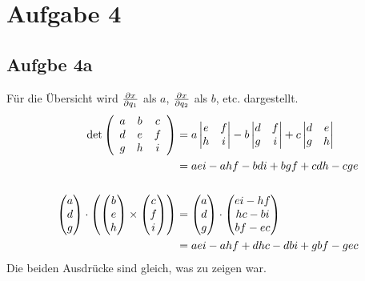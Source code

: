 \documentclass[a4paper,10pt]{extarticle}
\begin{document}
\section*{Aufgabe 4}
  \subsection*{Aufgbe 4a}
  Für die Übersicht wird $\pdv{x}{q_1}$ als $a$, $\pdv{x}{q_2}$ als $b$, etc. dargestellt.
  \begin{align*}
  \det \left(\begin{array}{c c c}
    a & b & c \\
    d & e & f \\
    g & h & i \\
  \end{array}\right) &= a \begin{vmatrix} e & f \\ h & i \end{vmatrix} - b \begin{vmatrix} d & f \\ g & i \end{vmatrix} + c \begin{vmatrix} d & e \\ g & h\end{vmatrix} \\
  &= aei - ahf - bdi + bgf + cdh - cge \\ \\
  \begin{pmatrix} a \\ d \\ g \end{pmatrix} \cdot \begin{pmatrix} \begin{pmatrix} b \\ e \\ h \end{pmatrix} \times \begin{pmatrix} c \\ f \\ i \end{pmatrix} \end{pmatrix} &= \begin{pmatrix} a \\ d \\ g \end{pmatrix} \cdot \begin{pmatrix} ei - hf \\ hc - bi \\ bf - ec \end{pmatrix} \\
  &= aei - ahf + dhc - dbi + gbf - gec
  \end{align*}
  Die beiden Ausdrücke sind gleich, was zu zeigen war.
\end{document}
